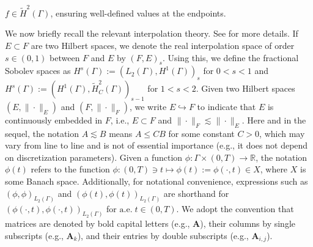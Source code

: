 \documentclass[numbers,webpdf]{ima-authoring-template}%
\theoremstyle{thmstyletwo}%
\numberwithin{equation}{section}
\newcommand{\almosteverywhere}{\mathrm{a.e.}\;}
\begin{document}
$f\in\widetilde{H}^2(\Gamma)$, ensuring well-defined values at the endpoints.


We now briefly recall the relevant interpolation theory. See \cite{ChandlerWilde2015interpolation} for more details. If $ E \subset F $ are two Hilbert spaces, we denote the real interpolation space of order $ s \in (0, 1) $ between $ F $ and $ E $ by $ (F, E)_s $. Using this, we define the fractional Sobolev spaces as $H^s(\Gamma) := (L_2(\Gamma), H^1(\Gamma))_s$ for $0 < s < 1$ and $H^s(\Gamma) := (H^1(\Gamma), \widetilde{H}_C^2(\Gamma))_{s-1}$ for $1 < s < 2$. Given two Hilbert spaces $(E, \|\cdot\|_E)$ and $(F, \|\cdot\|_F)$, we write $E\hookrightarrow F$ to indicate that $E$ is continuously embedded in $F$, i.e., $E\subset F$ and $\|\cdot\|_{F}\lesssim \|\cdot\|_{E}$. Here and in the sequel, the notation $A\lesssim B$ means $A\leq CB$ for some constant $C>0$, which may vary from line to line and is not of essential importance (e.g., it does not depend on discretization parameters). Given a function $\phi:\Gamma\times(0,T)\to\mathbb{R}$, the notation $\phi(t)$ refers to the function $\phi:(0,T)\ni t\mapsto \phi(t) := \phi(\cdot, t)\in X$, where $X$ is some Banach space. Additionally, for notational convenience, expressions such as $(\phi,\phi)_{L_2(\Gamma)}$ and $(\phi(t),\phi(t))_{L_2(\Gamma)}$ are shorthand for $(\phi(\cdot,t),\phi(\cdot,t))_{L_2(\Gamma)}$ for $\almosteverywhere t\in(0,T)$. We adopt the convention that matrices are denoted by bold capital letters (e.g., $\mathbf{A}$), their columns by single subscripts (e.g., $\mathbf{A}_k$), and their entries by double subscripts (e.g., $\mathbf{A}_{i,j}$).
\end{document}

